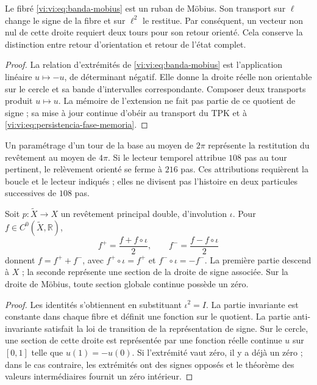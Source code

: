 \begin{theorem}
\label{vi:vi:thm:retorno-mobius}
Le fibré \eqref{vi:vi:eq:banda-mobius} est un ruban de Möbius.
Son transport sur $\ell$ change le signe de la fibre et sur
$\ell^2$ le restitue. Par conséquent, un vecteur non nul de cette droite
requiert deux tours pour son retour orienté. Cela conserve la
distinction entre retour d’orientation et retour de l’état complet.
\end{theorem}
\begin{proof}
La relation d’extrémités de \eqref{vi:vi:eq:banda-mobius} est l’application
linéaire $u\mapsto-u$, de déterminant négatif. Elle donne la droite réelle
non orientable sur le cercle et sa bande
d’intervalles correspondante. Composer deux transports produit $u\mapsto u$.
La mémoire de l’extension ne fait pas partie de ce quotient de signe ;
sa mise à jour continue d’obéir au transport du TPK et à
\eqref{vi:vi:eq:persistencia-fase-memoria}.
\end{proof}

Un paramétrage d’un tour de la base au moyen de $2\pi$
représente la restitution du revêtement au moyen de $4\pi$. Si le
lecteur temporel attribue $108$ pas au tour pertinent, le
relèvement orienté se ferme à $216$ pas. Ces attributions
requièrent la boucle et le lecteur indiqués ; elles ne divisent pas l’histoire en
deux particules successives de $108$ pas.

\begin{proposition}
\label{vi:vi:prop:observables-paridad}
Soit $p:\widetilde X\to X$ un revêtement principal double, d’involution
$\iota$. Pour $f\in C^0(\widetilde X,\mathbb R)$,
\[
 f^+=\frac{f+f\circ\iota}{2},\qquad
 f^-=\frac{f-f\circ\iota}{2}
\]
donnent $f=f^++f^-$, avec $f^+\circ\iota=f^+$ et
$f^-\circ\iota=-f^-$. La première partie descend à $X$ ; la
seconde représente une section de la droite de signe associée. Sur
la droite de Möbius, toute section globale continue possède un zéro.
\end{proposition}
\begin{proof}
Les identités s’obtiennent en substituant $\iota^2=I$. La partie
invariante est constante dans chaque fibre et définit une fonction sur le
quotient. La partie anti-invariante satisfait la loi de transition
de la représentation de signe. Sur le cercle, une section de cette
droite est représentée par une fonction réelle continue $u$ sur $[0,1]$
telle que $u(1)=-u(0)$. Si l’extrémité vaut zéro, il y a déjà un zéro ; dans le cas
contraire, les extrémités ont des signes opposés et le théorème des
valeurs intermédiaires fournit un zéro intérieur.
\end{proof}

